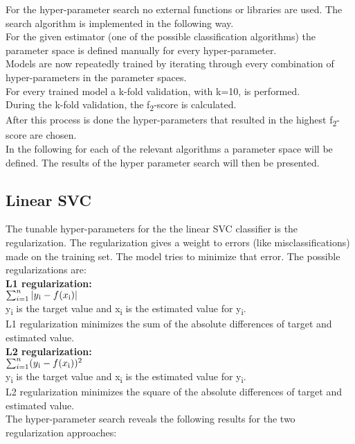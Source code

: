 For the hyper-parameter search no external functions or libraries are used. The search algorithm is implemented in the following way.\\ For the given estimator (one of the possible classification algorithms) the parameter space is defined manually for every hyper-parameter.\\
Models are now repeatedly trained by iterating through every combination of hyper-parameters in the parameter spaces.\\
For every trained model a  k-fold validation, with k=10, is performed.\\
During the k-fold validation, the f\textsubscript{2}-score is calculated.\\
After this process is done the hyper-parameters that resulted in the highest f\textsubscript{2}-score are chosen.\\
In the following for each of the relevant algorithms a parameter space will be defined. The results of the hyper parameter search will then be presented.

\subsection*{Linear SVC}
The tunable hyper-parameters for the the linear SVC classifier is the regularization. The regularization gives a weight to errors (like misclassifications) made on the training set. The model tries to minimize that error. The possible regularizations are:\\
\textbf{L1 regularization:}\\
$\sum_{i=1}^{n}|y\textsubscript{i}-f(x\textsubscript{i})| $ \\
 y\textsubscript{i} is the target value and x\textsubscript{i} is the estimated value for y\textsubscript{i}.\\
 L1 regularization minimizes the sum of the absolute differences of target and estimated value.
\\
\textbf{L2 regularization:}  \\
$\sum_{i=1}^{n}(y\textsubscript{i}-f(x\textsubscript{i}))^2 $ \\
 y\textsubscript{i} is the target value and x\textsubscript{i} is the estimated value for y\textsubscript{i}.\\
 L2 regularization minimizes the square of the absolute differences of target and estimated value.
\\

The hyper-parameter search reveals the following results for the two regularization approaches: \\

